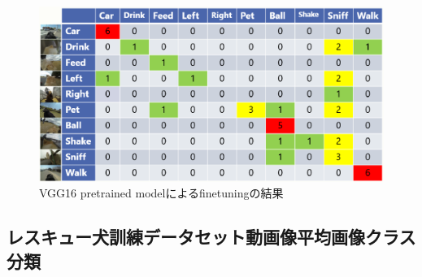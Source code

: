 \begin{figure}[htbp]
   \begin{center}

    \includegraphics[scale=0.5]{./Figures/vgg16_res.eps}
    \caption{VGG16 pretrained modelによるfinetuningの結果}
    \label{vgg16_res}
   \end{center}
\end{figure}



\subsection{レスキュー犬訓練データセット動画像平均画像クラス分類}

